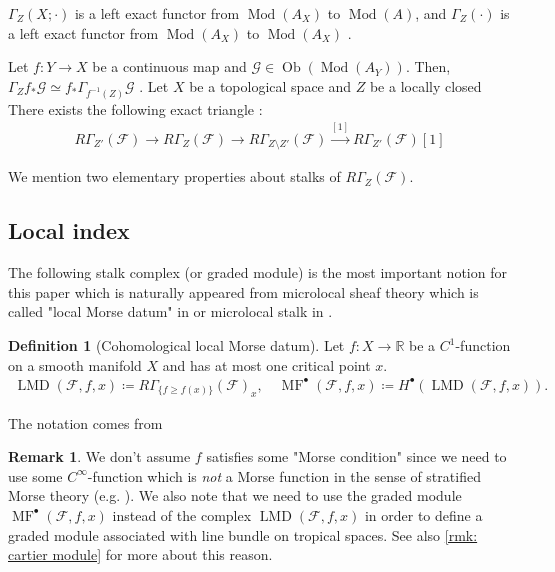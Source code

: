 \documentclass[a4paper,dvipdfmx,reqno,12pt]{amsart}
\theoremstyle{definition}
\newtheorem{Def}[Thm]{Definition}
\newtheorem{Rmk}[Thm]{Remark}
\newcommand{\deq}{\coloneqq}
\newcommand{\R}{\mathbb{R}}%
\newcommand{\mcal}[1]{\mathcal{#1}}%
\newcommand{\opn}[1]{\operatorname{#1}}
\newcommand{\xto}[1]{\xrightarrow{#1}}
\numberwithin{equation}{section}
\begin{document}
$\Gamma_Z(X;\cdot)$ is a left exact functor from 
$\opn{Mod}(A_X)$ to $\opn{Mod}(A)$,
and $\Gamma_{Z}(\cdot)$ is a left exact functor from
$\opn{Mod}(A_X)$ to $\opn{Mod}(A_X)$ 
\cite[Proposition 2.3.9 (i)]{MR1299726}.

Let $f\colon Y\to X$ be a continuous map and 
$\mcal{G}\in\opn{Ob}(\opn{Mod}(A_Y))$.
Then, $\Gamma_Zf_*\mcal{G}\simeq f_*\Gamma_{f^{-1}(Z)}\mcal{G}$
\cite[(2.3.20)]{MR1299726}.
Let $X$ be a topological space and $Z$ be a locally closed
There exists the following exact triangle 
\cite[(2.6.32)]{MR1299726}:
\begin{align}
  R\Gamma_{Z'}(\mcal{F})\to R\Gamma_{Z}(\mcal{F})\to 
R\Gamma_{Z\setminus Z'}(\mcal{F})\xto{[1]} R\Gamma_{Z'}(\mcal{F})[1]
\end{align}

We mention two elementary properties 
about stalks of $R\Gamma_{Z}(\mcal{F})$.

\subsection{Local index}

The following stalk complex (or graded module) is 
the most important notion
for this paper which is naturally appeared from 
microlocal sheaf theory 
which is called "local Morse datum" in \cite[p.271]{MR2031639} 
or microlocal stalk in \cite{MR4132582}.
\begin{Def}[{Cohomological local Morse datum}]
Let $f\colon X\to \R$ be a $C^{1}$-function on a smooth manifold $X$ and has 
at most one critical point $x$.
\begin{align}
\opn{LMD}(\mcal{F},f,x)\deq R\Gamma_{\{f\geq f(x)\}}
(\mcal{F})_x, \quad \opn{MF}^{\bullet}(\mcal{F},f,x)\deq 
H^{\bullet}(\opn{LMD}(\mcal{F},f,x)).
\end{align}
\end{Def}
The notation comes from \cite[p.271]{MR2031639}
\begin{Rmk}
We don't assume $f$ satisfies some 
"Morse condition" since
 we need to use some $C^{\infty}$-function
which is \emph{not} a Morse function in the sense of 
stratified Morse theory (e.g. \cite[Part 1.2.1]{MR932724}). 
We also note that we need to use 
the graded module $\opn{MF}^{\bullet}(\mcal{F},f,x)$ instead of 
the complex $\opn{LMD}(\mcal{F},f,x)$ in order to define
a graded module associated with line bundle on tropical
spaces. See also \cref{rmk: cartier module} for more about 
this reason.
\end{Rmk}
\end{document}
